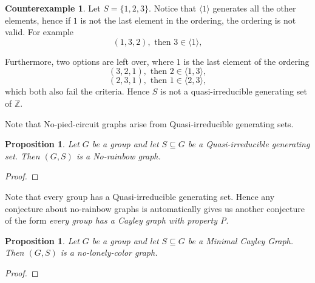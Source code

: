 \documentclass[a4paper,10pt]{article}
\numberwithin{equation}{section}
\newtheorem{proposition}[theorem]{Proposition}
\theoremstyle{definition}
\newtheorem*{counterexample}{Counterexample}
\begin{document}
    \begin{counterexample}
        Let \(S = \{1, 2, 3\}\). Notice that \(\langle 1\rangle\) generates all the other elements, hence if \(1\) is not the last element in the ordering, the ordering is not valid. For example
        \[(1, 3, 2), \text{\ then\ } 3\in\langle 1\rangle,\]

        Furthermore, two options are left over, where \(1\) is the last element of the ordering
        \[(3, 2, 1), \text{\ then\ } 2\in\langle 1,3\rangle,\]
        \[(2, 3, 1), \text{\ then\ } 1\in\langle 2,3\rangle,\]
        which both also fail the criteria.
        Hence \(S\) is not a quasi-irreducible generating set of \(\mathbb{Z}\).
    \end{counterexample}
    Note that No-pied-circuit graphs arise from Quasi-irreducible generating sets.
    \begin{proposition}
        Let \(G\) be a group and let \(S\subseteq G\) be a Quasi-irreducible generating set. Then \((G,S)\) is a No-rainbow graph.
    \end{proposition}
    \begin{proof}
        
    \end{proof}
    Note that every group has a Quasi-irreducible generating set. Hence any conjecture about no-rainbow graphs is automatically gives us another conjecture of the form \emph{every group has a Cayley graph with property P}.
    \begin{proposition}
        Let \(G\) be a group and let \(S\subseteq G\) be a Minimal Cayley Graph. Then \((G,S)\) is a no-lonely-color graph.
    \end{proposition}
    \begin{proof}
        
    \end{proof}
\end{document}
